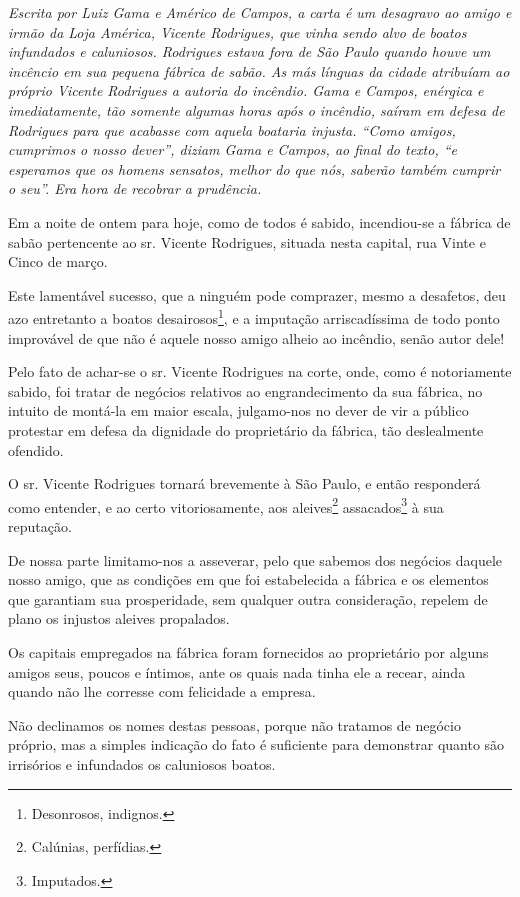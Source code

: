 \begin{didascalia}
\emph{Escrita por Luiz Gama e Américo de Campos, a carta é um desagravo
ao amigo e irmão da Loja América, Vicente Rodrigues, que vinha sendo
alvo de boatos infundados e caluniosos. Rodrigues estava fora de São
Paulo quando houve um incêncio em sua pequena fábrica de sabão. As más
línguas da cidade atribuíam ao próprio Vicente Rodrigues a autoria do
incêndio. Gama e Campos, enérgica e imediatamente, tão somente algumas
horas após o incêndio, saíram em defesa de Rodrigues para que acabasse
com aquela boataria injusta. ``Como amigos, cumprimos o nosso dever'',
diziam Gama e Campos, ao final do texto, ``e esperamos que os homens
sensatos, melhor do que nós, saberão também cumprir o seu''. Era hora de
recobrar a prudência.}
\end{didascalia}

Em a noite de ontem para hoje, como de todos é sabido, incendiou-se a
fábrica de sabão pertencente ao sr. Vicente Rodrigues, situada nesta
capital, rua Vinte e Cinco de março.

Este lamentável sucesso, que a ninguém pode comprazer, mesmo a
desafetos, deu azo entretanto a boatos desairosos\footnote{ Desonrosos,
  indignos.}, e a imputação arriscadíssima de todo ponto improvável de
que não é aquele nosso amigo alheio ao incêndio, senão autor dele!

Pelo fato de achar-se o sr. Vicente Rodrigues na corte, onde, como é
notoriamente sabido, foi tratar de negócios relativos ao engrandecimento
da sua fábrica, no intuito de montá-la em maior escala, julgamo-nos no
dever de vir a público protestar em defesa da dignidade do proprietário
da fábrica, tão deslealmente ofendido.

O sr. Vicente Rodrigues tornará brevemente à São Paulo, e então
responderá como entender, e ao certo vitoriosamente, aos
aleives\footnote{ Calúnias, perfídias.} assacados\footnote{ Imputados.}
à sua reputação.

De nossa parte limitamo-nos a asseverar, pelo que sabemos dos negócios
daquele nosso amigo, que as condições em que foi estabelecida a fábrica
e os elementos que garantiam sua prosperidade, sem qualquer outra
consideração, repelem de plano os injustos aleives propalados.

Os capitais empregados na fábrica foram fornecidos ao proprietário por
alguns amigos seus, poucos e íntimos, ante os quais nada tinha ele a
recear, ainda quando não lhe corresse com felicidade a empresa.

Não declinamos os nomes destas pessoas, porque não tratamos de negócio
próprio, mas a simples indicação do fato é suficiente para demonstrar
quanto são irrisórios e infundados os caluniosos boatos.

